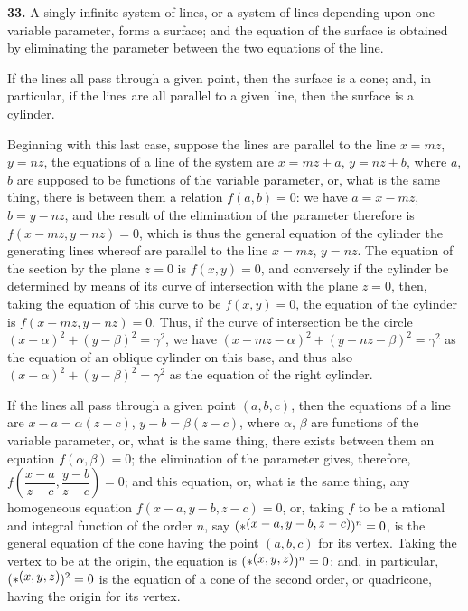 \documentclass[11pt,a4paper]{book}
\begin{document}
\textbf{33.} A singly infinite system of lines, or a system of lines depending upon one variable parameter, forms a surface; and the equation of the surface is obtained by eliminating the parameter between the two equations of the line.

If the lines all pass through a given point, then the surface is a cone; and, in particular, if the lines are all parallel to a given line, then the surface is a cylinder.

Beginning with this last case, suppose the lines are parallel to the line $x=mz$, $y=nz$, the equations of a line of the system are $x=mz+a$, $y=nz+b$, where $a$, $b$ are supposed to be functions of the variable parameter, or, what is the same thing, there is between them a relation $f(a,b)=0$: we have $a=x-mz$, $b=y-nz$, and the result of the elimination of the parameter therefore is $f(x-mz, y-nz)=0$, which is thus the general equation of the cylinder the generating lines whereof are parallel to the line $x=mz$, $y=nz$. The equation of the section by the plane $z=0$ is $f(x,y)=0$, and conversely if the cylinder be determined by means of its curve of intersection with the plane $z=0$, then, taking the equation of this curve to be $f(x,y)=0$, the equation of the cylinder is $f(x-mz, y-nz)=0$. Thus, if the curve of intersection be the circle $(x-\alpha)^2+(y-\beta)^2=\gamma^2$, we have $(x-mz-\alpha)^2+(y-nz-\beta)^2=\gamma^2$ as the equation of an oblique cylinder on this base, and thus also $(x-\alpha)^2+(y-\beta)^2=\gamma^2$ as the equation of the right cylinder.

If the lines all pass through a given point $(a,b,c)$, then the equations of a line are $x-a=\alpha(z-c)$, $y-b=\beta(z-c)$, where $\alpha$, $\beta$ are functions of the variable parameter, or, what is the same thing, there exists between them an equation $f(\alpha,\beta)=0$; the elimination of the parameter gives, therefore, $f\left(\dfrac{x-a}{z-c}, \dfrac{y-b}{z-c}\right)=0$; and this equation, or, what is the same thing, any homogeneous equation $f(x-a, y-b, z-c)=0$, or, taking $f$ to be a rational and integral function of the order $n$, say $(*\,\raisebox{0.5ex}{\text{$\!(x-a,y-b,z-c)$}})^n=0$, is the general equation of the cone having the point $(a,b,c)$ for its vertex. Taking the vertex to be at the origin, the equation is $(*\,\raisebox{0.5ex}{\text{$\!(x,y,z)$}})^n=0$; and, in particular, $(*\,\raisebox{0.5ex}{\text{$\!(x,y,z)$}})^2=0$ is the equation of a cone of the second order, or quadricone, having the origin for its vertex.
\end{document}
